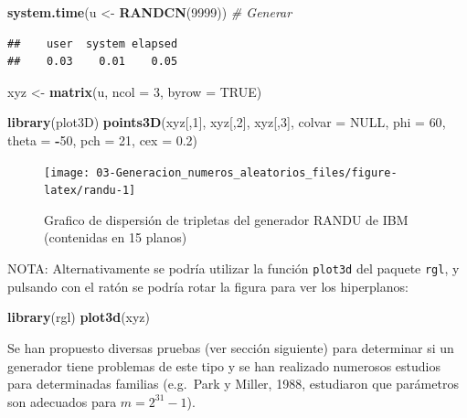 \documentclass[]{book}
\newenvironment{Shaded}{\begin{snugshade}}{\end{snugshade}}
\newcommand{\KeywordTok}[1]{\textcolor[rgb]{0.13,0.29,0.53}{\textbf{#1}}}
\newcommand{\DataTypeTok}[1]{\textcolor[rgb]{0.13,0.29,0.53}{#1}}
\newcommand{\DecValTok}[1]{\textcolor[rgb]{0.00,0.00,0.81}{#1}}
\newcommand{\FloatTok}[1]{\textcolor[rgb]{0.00,0.00,0.81}{#1}}
\newcommand{\StringTok}[1]{\textcolor[rgb]{0.31,0.60,0.02}{#1}}
\newcommand{\CommentTok}[1]{\textcolor[rgb]{0.56,0.35,0.01}{\textit{#1}}}
\newcommand{\OtherTok}[1]{\textcolor[rgb]{0.56,0.35,0.01}{#1}}
\newcommand{\OperatorTok}[1]{\textcolor[rgb]{0.81,0.36,0.00}{\textbf{#1}}}
\newcommand{\NormalTok}[1]{#1}
\theoremstyle{definition}
\theoremstyle{definition}
\theoremstyle{definition}
\theoremstyle{remark}
\begin{document}
\begin{Shaded}
\begin{Highlighting}[]
\KeywordTok{system.time}\NormalTok{(u <-}\StringTok{ }\KeywordTok{RANDCN}\NormalTok{(}\DecValTok{9999}\NormalTok{))  }\CommentTok{# Generar}
\end{Highlighting}
\end{Shaded}

\begin{verbatim}
##    user  system elapsed 
##    0.03    0.01    0.05
\end{verbatim}

\begin{Shaded}
\begin{Highlighting}[]
\NormalTok{xyz <-}\StringTok{ }\KeywordTok{matrix}\NormalTok{(u, }\DataTypeTok{ncol =} \DecValTok{3}\NormalTok{, }\DataTypeTok{byrow =} \OtherTok{TRUE}\NormalTok{)}

\KeywordTok{library}\NormalTok{(plot3D)}
\KeywordTok{points3D}\NormalTok{(xyz[,}\DecValTok{1}\NormalTok{], xyz[,}\DecValTok{2}\NormalTok{], xyz[,}\DecValTok{3}\NormalTok{], }\DataTypeTok{colvar =} \OtherTok{NULL}\NormalTok{, }\DataTypeTok{phi =} \DecValTok{60}\NormalTok{, }\DataTypeTok{theta =} \OperatorTok{-}\DecValTok{50}\NormalTok{, }\DataTypeTok{pch =} \DecValTok{21}\NormalTok{, }\DataTypeTok{cex =} \FloatTok{0.2}\NormalTok{)}
\end{Highlighting}
\end{Shaded}

\begin{figure}[!htb]

{\centering \texttt{[image: 03-Generacion\_numeros\_aleatorios\_files/figure-latex/randu-1]} 

}

\caption{Grafico de dispersión de tripletas del generador RANDU de IBM (contenidas en 15 planos)}\label{fig:randu}
\end{figure}

NOTA: Alternativamente se podría utilizar la función \texttt{plot3d} del
paquete \texttt{rgl}, y pulsando con el ratón se podría rotar la figura
para ver los hiperplanos:

\begin{Shaded}
\begin{Highlighting}[]
\KeywordTok{library}\NormalTok{(rgl)}
\KeywordTok{plot3d}\NormalTok{(xyz) }
\end{Highlighting}
\end{Shaded}

Se han propuesto diversas pruebas (ver sección siguiente) para
determinar si un generador tiene problemas de este tipo y se han
realizado numerosos estudios para determinadas familias (e.g.~Park y
Miller, 1988, estudiaron que parámetros son adecuados para
\(m=2^{31}-1\)).
\end{document}
